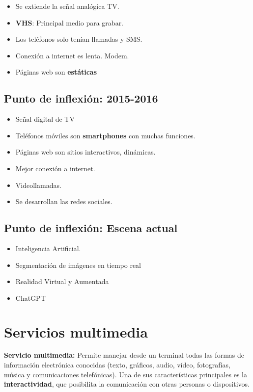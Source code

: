 \documentclass[11pt,a4paper]{article}
\begin{document}
	\begin{itemize}[]
		\item Se extiende la señal analógica TV.
		\item \textbf{VHS}: Principal medio para grabar.
		\item Los teléfonos solo tenían llamadas y SMS.
		\item Conexión a internet es lenta. Modem.
		\item Páginas web son \textbf{estáticas}
	\end{itemize}

	\subsection{Punto de inflexión: 2015-2016}

	\begin{itemize}[]
		\item Señal digital de TV
		\item Teléfonos móviles son \textbf{smartphones} con muchas funciones.
		\item Páginas web son sitios interactivos, dinámicas.
		\item Mejor conexión a internet.
		\item Videollamadas.
		\item Se desarrollan las redes sociales.
	\end{itemize}

	\subsection{Punto de inflexión: Escena actual}

	\begin{itemize}[]
		\item Inteligencia Artificial.
		\item Segmentación de imágenes en tiempo real
		\item Realidad Virtual y Aumentada
		\item ChatGPT
	\end{itemize}

\section{Servicios multimedia}

\begin{DefBox}
\textbf{Servicio multimedia:} Permite manejar desde un terminal todas las formas de información electrónica conocidas (texto, gráficos, audio, vídeo, fotografías, música y comunicaciones telefónicas).
Una de sus características principales es la \textbf{interactividad}, que posibilita la comunicación con otras personas o dispositivos.
\end{DefBox}
\end{document}
